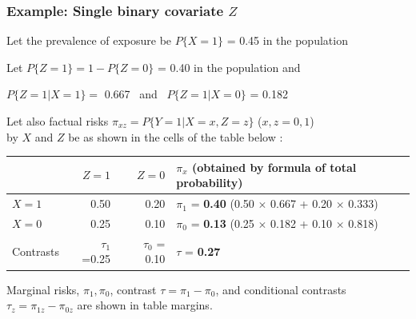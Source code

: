 \documentclass[12pt,dvipsnames,t,aspectratio=169, handout%
]{beamer}
\begin{document}
\begin{frame}
\frametitle{\large Example: Single binary covariate $Z$}

\bi
\item Let the prevalence of exposure be $P\{ X=1 \}$ = 0.45 in the population
\medskip
\item Let %
$P\{ Z=1 \} = 1 - P\{ Z=0 \}$ = 0.40 in the population and 
\begin{center}
 $P\{ Z=1|X=1\}=$ 0.667 \ and \ $P\{ Z=1| X=0\}$ = 0.182 
\end{center}
\pause
\medskip
\item Let also factual  risks $\pi_{xz} = P\{ Y=1|X=x, Z=z\}$ ($x,z=0,1$) \\
 by $X$ and $Z$ be as shown in the cells of the table below : 
\begin{center}
{\small
\begin{tabular}{l r r l}
\toprule
      & $Z=1$ & $Z=0$ & $\pi_x$ (obtained by formula of total probability) \\
\midrule						
$X=1$ & 0.50  & 0.20 & $\pi_1$ = \textbf{0.40} (0.50 $\times$ 0.667 + 0.20 $\times$ 0.333) \\
$X=0$ & 0.25  & 0.10 & $\pi_0$ = \textbf{0.13} (0.25 $\times$ 0.182 + 0.10 $\times$ 0.818) \\
\midrule
Contrasts & $\tau_1$ =0.25 & $\tau_0$ = 0.10 & $\tau$ = \textbf{0.27} \\
\bottomrule  
\end{tabular}
}
\end{center}
\pause
\medskip
\item %
 Marginal risks,
$\pi_1, \pi_0$,  contrast $\tau = \pi_1 - \pi_0$,
and conditional contrasts 
$\tau_z = \pi_{1z} - \pi_{0z}$ are shown in table margins.
\ei

\end{frame}
\end{document}
